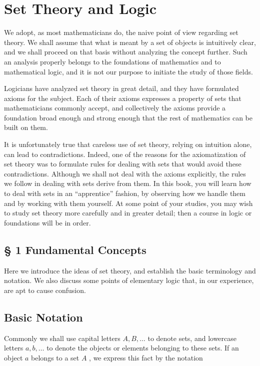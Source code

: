 \chapter{Set Theory and Logic}

We adopt, as most mathematicians do, the naive point of view\cite{Halmos1960} regarding set theory. We shall assume that what is meant by a set of objects is intuitively clear, and we shall proceed on that basis without analyzing the concept further. Such an analysis properly belongs to the foundations of mathematics\cite{Wilder1965} and to mathematical logic, and it is not our purpose to initiate the study of those fields.

Logicians have analyzed set theory in great detail, and they have formulated axioms for the subject. Each of their axioms expresses a property of sets that mathematicians commonly accept, and collectively the axioms provide a foundation broad enough and strong enough that the rest of mathematics can be built on them.

It is unfortunately true that careless use of set theory, relying on intuition alone, can lead to contradictions. Indeed, one of the reasons for the axiomatization of set theory was to formulate rules for dealing with sets that would avoid these contradictions. Although we shall not deal with the axioms explicitly, the rules we follow in dealing with sets derive from them. In this book, you will learn how to deal with sets in an ``apprentice'' fashion, by observing how we handle them and by working with them yourself. At some point of your studies, you may wish to study set theory more carefully and in greater detail; then a course in logic or foundations will be in order.

\section*{§ 1 Fundamental Concepts}

Here we introduce the ideas of set theory, and establish the basic terminology and notation. We also discuss some points of elementary logic that, in our experience, are apt to cause confusion.

\section*{Basic Notation}

Commonly we shall use capital letters \(A,B,\ldots\) to denote sets, and lowercase letters \(a,b,\ldots\) to denote the objects or elements belonging to these sets. If an object \(a\) belongs to a set \(A\) , we express this fact by the notation


